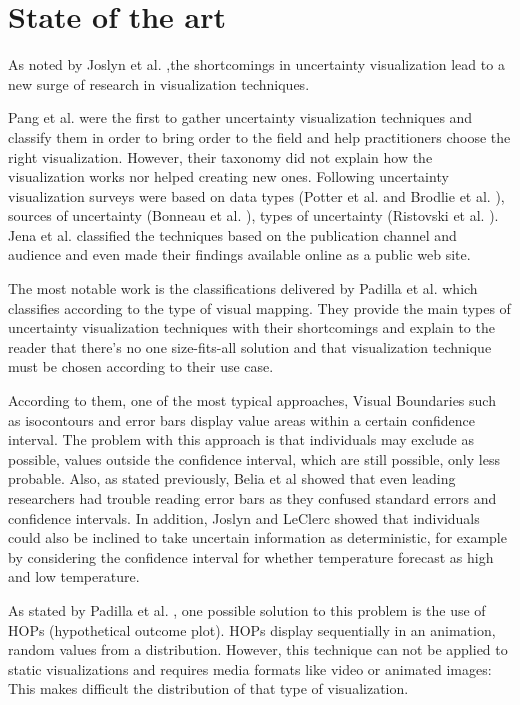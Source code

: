\documentclass[a4paper,3p,sort&compress]{elsarticle}
\begin{document}
\section{State of the art}
\label{sec:results}

As noted by Joslyn et al. \cite{joslyn_communicating_2010},the shortcomings in uncertainty visualization lead to a new surge of 
research in visualization techniques. 

Pang et al. \cite{pang_approaches_1997} were the first to gather uncertainty visualization techniques and classify them in 
order to bring order to the field and help 
practitioners choose the right visualization. However, their taxonomy did not explain how the visualization works nor helped creating new 
ones. Following uncertainty visualization surveys were based on data types (Potter et al. \cite{potter_quantification_2012} and Brodlie et al. 
\cite{brodlie_review_2012}), 
sources of uncertainty (Bonneau et al. \cite{bonneau_overview_2014}), types of uncertainty 
(Ristovski et al. \cite{ristovski_uncertainty_2014}). Jena et al. \cite{jena_uncertainty_2020} classified the techniques 
based on the publication channel and audience and even made their findings available online as a 
public web site. 

The most notable work is the classifications delivered by Padilla et al. \cite{padilla_uncertainty_2021} which classifies according to 
the type of visual mapping. They provide the main types of uncertainty visualization techniques with their shortcomings and 
explain to the reader that there's no one size-fits-all solution and that visualization technique must be chosen according to their use case.

According to them, one of the most typical approaches, Visual Boundaries such as isocontours and error 
bars display value areas within a certain confidence interval. The problem with this approach is 
that individuals may exclude as possible, values outside the confidence interval, which are still 
possible, only less probable. Also, as stated previously, Belia et al \cite{belia_researchers_2005} showed that even leading researchers had 
trouble reading error bars as they confused 
standard errors and confidence intervals. In addition, Joslyn and LeClerc showed that individuals could also be inclined to take uncertain 
information as deterministic, for example by considering the confidence interval for whether temperature 
forecast as high and low temperature. 

As stated by Padilla et al. \cite{padilla_uncertainty_2021}, one possible solution to this problem is the use of HOPs 
(hypothetical outcome plot). HOPs display 
sequentially in an animation, random values from a distribution. However, this technique can not be 
applied to static visualizations and requires media formats like video or animated images: This makes difficult the distribution 
of that type of visualization.
\end{document}

